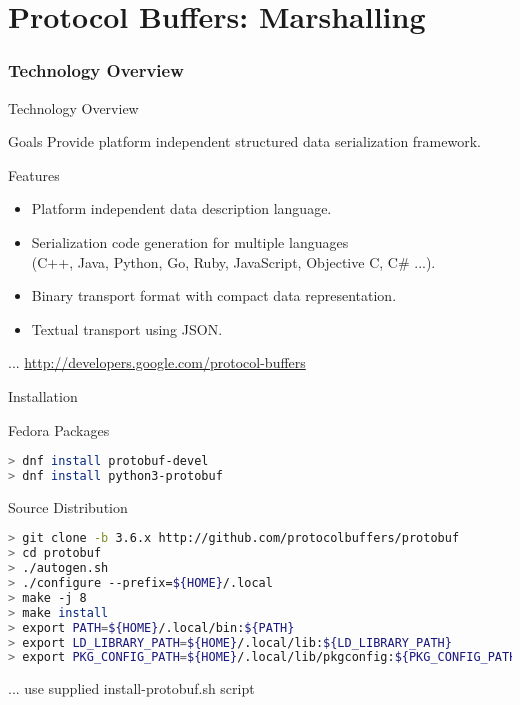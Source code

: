 \part{Protocol Buffers: Marshalling}


\section{Technology Overview}


\begin{frame}{Technology Overview}
    \begin{block}{Goals}
        Provide platform independent structured data serialization framework.
    \end{block}

    \bigskip

    \begin{block}{Features}
        \begin{itemize}
            \item Platform independent data description language.
            \item Serialization code generation for multiple languages \\
                  (C++, Java, Python, Go, Ruby, JavaScript, Objective C, C\# ...).
            \item Binary transport format with compact data representation.
            \item Textual transport using JSON.
        \end{itemize}
    \end{block}

    \bigskip

    \hfill ... \url{http://developers.google.com/protocol-buffers}
\end{frame}


\begin{frame}[fragile]{Installation}
    \begin{block}{Fedora Packages}
\begin{lstlisting}[language=bash,style=mini]
> dnf install protobuf-devel
> dnf install python3-protobuf
\end{lstlisting}
    \end{block}

    \bigskip

    \begin{block}{Source Distribution}
\begin{lstlisting}[language=bash,style=mini]
> git clone -b 3.6.x http://github.com/protocolbuffers/protobuf
> cd protobuf
> ./autogen.sh
> ./configure --prefix=${HOME}/.local
> make -j 8
> make install
> export PATH=${HOME}/.local/bin:${PATH}
> export LD_LIBRARY_PATH=${HOME}/.local/lib:${LD_LIBRARY_PATH}
> export PKG_CONFIG_PATH=${HOME}/.local/lib/pkgconfig:${PKG_CONFIG_PATH}
\end{lstlisting}
    \end{block}

    \bigskip

    \hfill ... use supplied install-protobuf.sh script
\end{frame}


